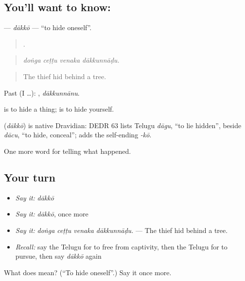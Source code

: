 \subsection*{You'll want to know: }
\textbf{} — \emph{dākkō} — \textquotedblleft{}to hide oneself\textquotedblright{}.

\begin{quote}
   .
\end{quote}

\begin{quote}
\emph{doṅga ceṭṭu venaka dākkunnāḍu.}
\end{quote}

\begin{quote}
The thief hid behind a tree.
\end{quote}

Past (I …): , \emph{dākkunnānu}.

 is to hide a thing;  is to hide yourself.

\begin{cousinweb}
\textbf{} (\emph{dākkō}) is native Dravidian: DEDR 63 lists Telugu \emph{dāgu}, \textquotedblleft{}to lie hidden\textquotedblright{}, beside \emph{dācu}, \textquotedblleft{}to hide, conceal\textquotedblright{};  adds the self-ending \emph{-kō}.
\end{cousinweb}

\begin{grammarlens}[title={What you've built}]
One more word for telling what happened.
\end{grammarlens}

\subsection*{Your turn}
\begin{itemize}
\raggedright
  \item \emph{Say it:} \emph{dākkō}
  \item \emph{Say it:} \emph{dākkō}, once more
  \item \emph{Say it:} \emph{doṅga ceṭṭu venaka dākkunnāḍu.} — The thief hid behind a tree.
  \item \emph{Recall:} say the Telugu for to free from captivity, then the Telugu for to pursue, then say \emph{dākkō} again
\end{itemize}

\begin{tcolorbox}[breakable,colback=teal!4,colframe=teal!35!black,title={Before you move on}]
What does  mean? (\textquotedblleft{}To hide oneself\textquotedblright{}.) Say it once more.
\end{tcolorbox}
